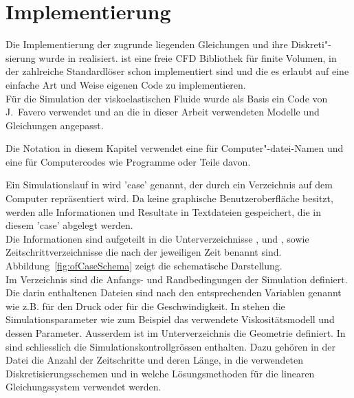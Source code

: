 \section{Implementierung}
\label{Kapitel:Implementierung}
Die Implementierung der zugrunde liegenden Gleichungen und ihre Diskreti"-sierung wurde in \openfoam{} \cite{openfoam} realisiert.
\openfoam{} ist eine freie CFD Bibliothek für finite Volumen, in der zahlreiche Standardlöser schon implementiert sind und die es erlaubt auf eine einfache Art und Weise eigenen Code zu implementieren.\\
Für die Simulation der viskoelastischen Fluide wurde als Basis ein Code von J.~Favero \cite{faveroOF} verwendet und an die in dieser Arbeit verwendeten Modelle und Gleichungen angepasst.

Die Notation in diesem Kapitel verwendet eine  für Computer"-datei-Namen und eine  für Computercodes wie Programme oder Teile davon.

Ein Simulationslauf in \openfoam{} wird 'case' genannt, der durch ein Verzeichnis auf dem Computer repräsentiert wird. Da \openfoam{} keine gra\-phi\-sche Benutzeroberfläche besitzt, werden alle Informationen und Resultate in Textdateien gespeichert, die in diesem 'case' abgelegt werden.\\
Die Informationen sind aufgeteilt in die Unterverzeichnisse ,  und , sowie Zeitschrittverzeichnisse die nach der jeweiligen Zeit benannt sind. Abbildung~\ref{fig:ofCaseSchema} zeigt die schematische Darstellung.\\ %
Im Verzeichnis  sind die Anfangs- und Randbedingungen der Simulation definiert. Die darin enthaltenen Dateien sind nach den entsprechenden Variablen genannt wie z.B.  für den Druck oder  für die Geschwindigkeit.
In  stehen die Simulationsparameter wie zum Beispiel das verwendete Viskositätsmodell und dessen Parameter. Ausserdem ist im Unterverzeichnis  die Geometrie definiert.
In  sind schliesslich die Simulationskontrollgrössen enthalten. Dazu gehören in der Datei  die Anzahl der Zeitschritte und deren Länge, in  die verwendeten Diskretisierungsschemen und in  welche Lösungsmethoden für die linearen Gleichungssystem verwendet werden.

